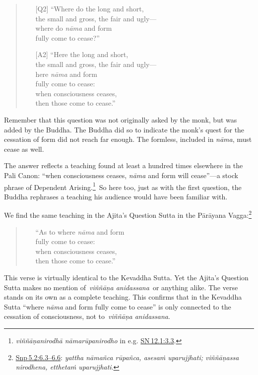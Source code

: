 \documentclass[10pt, openright]{book}
\begin{document}
\begin{quote}


\begin{itemize}

\item[{[Q2]}]“Where do the long and short, \\ the small and gross, the fair and ugly— \\ where do \textit{nāma} and form \\ fully come to cease?”


\item[{[A2]}]“Here the long and short, \\ the small and gross, the fair and ugly— \\ here \textit{nāma} and form \\ fully come to cease: \\ when consciousness ceases, \\ then those come to cease.”

\end{itemize}

\end{quote}
Remember that this question was not originally asked by the monk, but was added by the Buddha. The Buddha did so to indicate the monk’s quest for the cessation of form did not reach far enough. The formless, included in \textit{nāma}, must cease as well.


The answer reflects a teaching found at least a hundred times elsewhere in the Pali Canon: “when consciousness ceases, \textit{nāma} and form will cease”—a stock phrase of Dependent Arising.\footnote {\textit{viññāṇanirodhā nāmarūpanirodho} in e.g. \href{https://suttacentral.net/sn12.1/en/sujato\#3.3}{SN 12.1:3.3}.} So here too, just as with the first question, the Buddha rephrases a teaching his audience would have been familiar with.


We find the same teaching in the Ajita’s Question Sutta in the Pārāyana Vagga:\footnote {\href{https://suttacentral.net/snp5.2/en/sujato\#6.3}{Snp 5.2:6.3–6.6}: \textit{yattha nāmañca rūpañca, asesaṁ uparujjhati; viññāṇassa nirodhena, etthetaṁ uparujjhati}.}


\begin{quote}


\begin{itemize}

\item[{}]“As to where \textit{nāma} and form \\ fully come to cease: \\ when consciousness ceases, \\ then those come to cease.”

\end{itemize}

\end{quote}
This verse is virtually identical to the Kevaddha Sutta. Yet the Ajita’s Question Sutta makes no mention of \textit{viññāṇa anidassana} or anything alike. The verse stands on its own as a complete teaching. This confirms that in the Kevaddha Sutta “where \textit{nāma} and form fully come to cease” is only connected to the cessation of consciousness, not to \textit{viññāṇa anidassana}.
\end{document}
